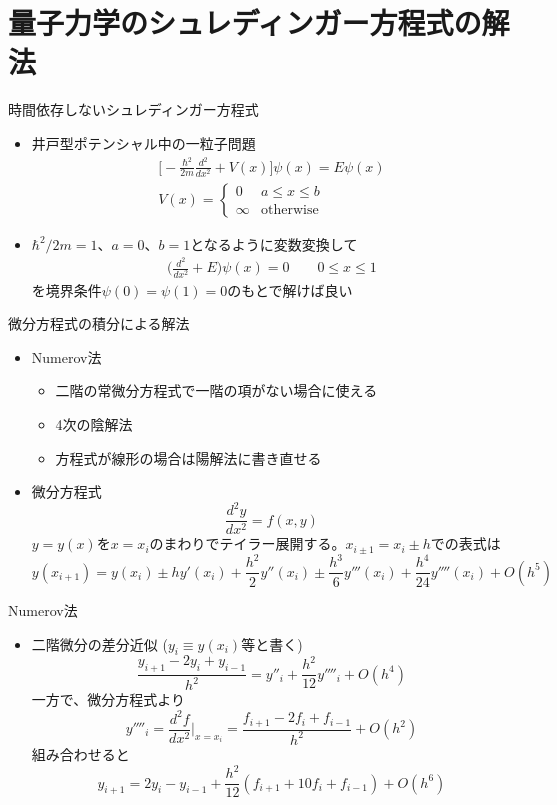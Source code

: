 \documentclass[dvipdfmx]{beamer}
\begin{document}
\section{量子力学のシュレディンガー方程式の解法}

\begin{frame}[t,fragile]{時間依存しないシュレディンガー方程式}
  \begin{itemize}
    \setlength{\itemsep}{1em}
  \item 井戸型ポテンシャル中の一粒子問題
    \begin{align*}
      \big[ -\frac{\hbar^2}{2m}\frac{d^2}{dx^2} + V(x) \big] \psi(x) = E \psi(x) \\
      V(x) = \begin{cases}
        0 & \text{$a \le x \le b$} \\ \infty & \text{otherwise}
      \end{cases}
    \end{align*}
  \item $\hbar^2/2m = 1$、$a=0$、$b=1$となるように変数変換して
    \begin{align*}
      \big( \frac{d^2}{dx^2} + E \big) \psi(x) = 0 \qquad 0 \le x \le 1
    \end{align*}
    を境界条件$\psi(0) = \psi(1) = 0$のもとで解けば良い
  \end{itemize}
\end{frame}

\begin{frame}[t,fragile]{微分方程式の積分による解法}
  \begin{itemize}
    \setlength{\itemsep}{1em}
  \item Numerov法
    \begin{itemize}
    \item 二階の常微分方程式で一階の項がない場合に使える
    \item 4次の陰解法
    \item 方程式が線形の場合は陽解法に書き直せる
    \end{itemize}
  \item 微分方程式
    \[
    \frac{d^2y}{dx^2} = f(x,y)
    \]
  $y=y(x)$を$x=x_i$のまわりでテイラー展開する。$x_{i \pm 1} = x_i \pm h$での表式は
      \[
      y(x_{i+1}) = y(x_i) \pm h y'(x_i) + \frac{h^2}{2} y''(x_i) \pm \frac{h^3}{6} y'''(x_i) + \frac{h^4}{24} y''''(x_i)  + O(h^5)
      \]
  \end{itemize}
\end{frame}

\begin{frame}[t,fragile]{Numerov法}
  \begin{itemize}
    \setlength{\itemsep}{1em}
  \item 二階微分の差分近似 ($y_i \equiv y(x_i)$等と書く)
    \[
    \frac{y_{i+1} - 2 y_i + y_{i-1}}{h^2} = y''_{i} + \frac{h^2}{12} y''''_{i} + O(h^4)
    \]
  一方で、微分方程式より
    \[
    y''''_i = \frac{d^2f}{dx^2}\Big|_{x=x_i} = \frac{f_{i+1}-2f_i+f_{i-1}}{h^2} + O(h^2)
    \]
    組み合わせると
    \[
    y_{i+1} = 2y_i - y_{i-1} + \frac{h^2}{12} (f_{i+1} + 10f_{i} + f_{i-1}) + O(h^6)
    \]
  \end{itemize}
\end{frame}
\end{document}
